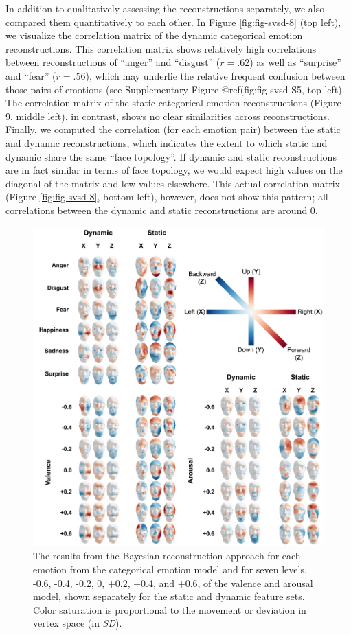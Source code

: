 \documentclass[11pt,american,]{memoir} %
\begin{document}
In addition to qualitatively assessing the reconstructions separately, we also compared them quantitatively to each other. In Figure \ref{fig:fig-svsd-8} (top left), we visualize the correlation matrix of the dynamic categorical emotion reconstructions. This correlation matrix shows relatively high correlations between reconstructions of ``anger'' and ``disgust'' (\(r = .62\)) as well as ``surprise'' and ``fear'' (\(r = .56\)), which may underlie the relative frequent confusion between those pairs of emotions (see Supplementary Figure @ref(fig:fig-svsd-S5, top left). The correlation matrix of the static categorical emotion reconstructions (Figure 9, middle left), in contrast, shows no clear similarities across reconstructions. Finally, we computed the correlation (for each emotion pair) between the static and dynamic reconstructions, which indicates the extent to which static and dynamic share the same ``face topology''. If dynamic and static reconstructions are in fact similar in terms of face topology, we would expect high values on the diagonal of the matrix and low values elsewhere. This actual correlation matrix (Figure \ref{fig:fig-svsd-8}, bottom left), however, does not show this pattern; all correlations between the dynamic and static reconstructions are around 0.

\begin{figure}
\centering
\includegraphics{_bookdown_files/static-vs-dynamic-files/figures/figure_7.pdf}
\caption{\label{fig:fig-svsd-7}The results from the Bayesian reconstruction approach for each emotion from the categorical emotion model and for seven levels, -0.6, -0.4, -0.2, 0, +0.2, +0.4, and +0.6, of the valence and arousal model, shown separately for the static and dynamic feature sets. Color saturation is proportional to the movement or deviation in vertex space (in \emph{SD}).}
\end{figure}
\end{document}
